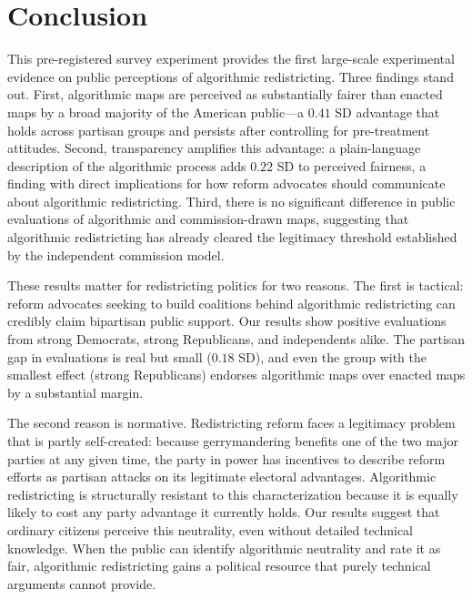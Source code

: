 \section{Conclusion}
\label{sec:conclusion}

This pre-registered survey experiment provides the first large-scale experimental evidence on public perceptions of algorithmic redistricting. Three findings stand out. First, algorithmic maps are perceived as substantially fairer than enacted maps by a broad majority of the American public---a $0.41$ SD advantage that holds across partisan groups and persists after controlling for pre-treatment attitudes. Second, transparency amplifies this advantage: a plain-language description of the algorithmic process adds $0.22$ SD to perceived fairness, a finding with direct implications for how reform advocates should communicate about algorithmic redistricting. Third, there is no significant difference in public evaluations of algorithmic and commission-drawn maps, suggesting that algorithmic redistricting has already cleared the legitimacy threshold established by the independent commission model.

These results matter for redistricting politics for two reasons. The first is tactical: reform advocates seeking to build coalitions behind algorithmic redistricting can credibly claim bipartisan public support. Our results show positive evaluations from strong Democrats, strong Republicans, and independents alike. The partisan gap in evaluations is real but small ($0.18$ SD), and even the group with the smallest effect (strong Republicans) endorses algorithmic maps over enacted maps by a substantial margin.

The second reason is normative. Redistricting reform faces a legitimacy problem that is partly self-created: because gerrymandering benefits one of the two major parties at any given time, the party in power has incentives to describe reform efforts as partisan attacks on its legitimate electoral advantages. Algorithmic redistricting is structurally resistant to this characterization because it is equally likely to cost any party advantage it currently holds. Our results suggest that ordinary citizens perceive this neutrality, even without detailed technical knowledge. When the public can identify algorithmic neutrality and rate it as fair, algorithmic redistricting gains a political resource that purely technical arguments cannot provide.

